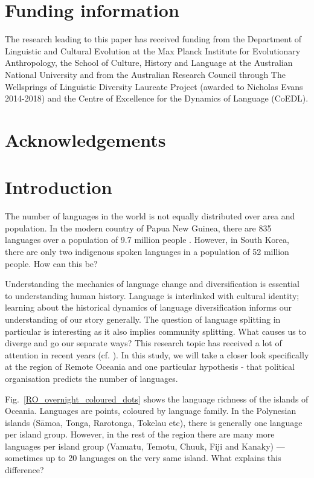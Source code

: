\documentclass[unnumsec,webpdf,modern,medium]{oup-authoring-template}
\begin{document}


\section*{Funding information}
The research leading to this paper has received funding from the Department of Linguistic and Cultural Evolution at the Max Planck Institute for Evolutionary Anthropology, the School of Culture, History and Language at the Australian National University and from the Australian Research Council through The Wellsprings of Linguistic Diversity Laureate Project (awarded to Nicholas Evans 2014-2018) and the Centre of Excellence for the Dynamics of Language (CoEDL).

\section*{Acknowledgements}



\newpage

\onecolumn
\section{Introduction}
\doublespacing

The number of languages in the world is not equally distributed over area and population. In the modern country of Papua New Guinea, there are 835 languages over a population of 9.7 million people \citep{UN_pop, glottolog3}. However, in South Korea, there are only two indigenous spoken languages in a population of 52 million people. How can this be?

Understanding the mechanics of language change and diversification is essential to understanding human history. Language is interlinked with cultural identity; learning about the historical dynamics of language diversification informs our understanding of our story generally. The question of language splitting in particular is interesting as it also implies community splitting. What causes us to diverge and go our separate ways? This research topic has received a lot of attention in recent years (cf. \citet{gavin2017process,  greenhill2015demographic, Pacheco_Coelho_2019, hua2019ecological}). In this study, we will take a closer look specifically at the region of Remote Oceania and one particular hypothesis - that political organisation predicts the number of languages.

Fig.~\ref{RO_overnight_coloured_dots} shows the language richness of the islands of Oceania. Languages are points, coloured by language family. In the Polynesian islands (S\={a}moa, Tonga, Rarotonga, Tokelau etc), there is generally one language per island group. However, in the rest of the region there are many more languages per island group (Vanuatu, Temotu, Chuuk, Fiji and Kanaky) --- sometimes up to 20 languages on the very same island. What explains this difference?
\end{document}
